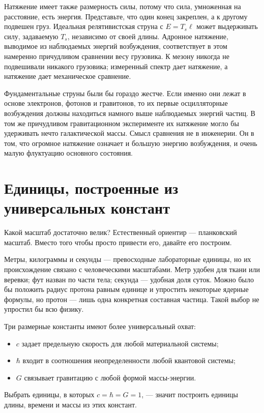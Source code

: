 Натяжение имеет также размерность силы, потому что сила, умноженная на расстояние, есть энергия. Представьте, что один конец закреплен, а к другому подвешен груз. Идеальная релятивистская струна с \(E=T_s\ell\) может выдерживать силу, задаваемую \(T_s\), независимо от своей длины. Адронное натяжение, выводимое из наблюдаемых энергий возбуждения, соответствует в этом намеренно причудливом сравнении весу грузовика. К мезону никогда не подвешивали никакого грузовика; измеренный спектр дает натяжение, а натяжение дает механическое сравнение.

Фундаментальные струны были бы гораздо жестче. Если именно они лежат в основе электронов, фотонов и гравитонов, то их первые осцилляторные возбуждения должны находиться намного выше наблюдаемых энергий частиц. В том же причудливом гравитационном эксперименте их натяжение могло бы удерживать нечто галактической массы. Смысл сравнения не в инженерии. Он в том, что огромное натяжение означает и большую энергию возбуждения, и очень малую флуктуацию основного состояния.

\section{Единицы, построенные из универсальных констант}

Какой масштаб достаточно велик? Естественный ориентир — планковский масштаб. Вместо того чтобы просто привести его, давайте его построим.

Метры, килограммы и секунды — превосходные лабораторные единицы, но их происхождение связано с человеческими масштабами. Метр удобен для ткани или веревки; фут назван по части тела; секунда — удобная доля суток. Можно было бы положить радиус протона равным единице и упростить некоторые ядерные формулы, но протон — лишь одна конкретная составная частица. Такой выбор не упростил бы всю физику.

Три размерные константы имеют более универсальный охват:
\begin{itemize}
  \item \(c\) задает предельную скорость для любой материальной системы;
  \item \(\hbar\) входит в соотношения неопределенности любой квантовой
  системы;
  \item \(G\) связывает гравитацию с любой формой массы-энергии.
\end{itemize}
Выбрать единицы, в которых \(c=\hbar=G=1\), — значит построить единицы длины, времени и массы из этих констант.


